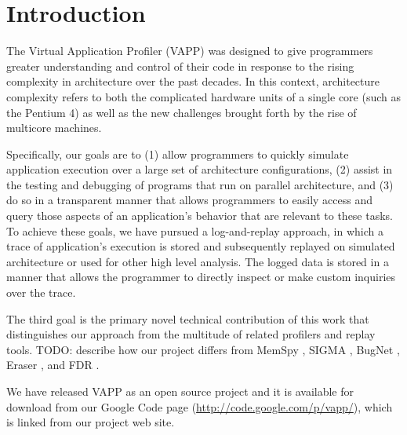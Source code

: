 \section{Introduction}
The Virtual Application Profiler (VAPP) was designed to give programmers
greater understanding and control of their code in response to
the rising complexity in architecture over the past decades.
In this context, architecture complexity refers to both the
complicated hardware units of a single core (such as the Pentium 4)
as well as the new challenges brought forth by the rise of
multicore machines.

Specifically, our goals are to (1) allow programmers to quickly
simulate application execution over a large set of architecture
configurations, (2) assist in the testing and debugging of
programs that run on parallel architecture, and (3) do so in a
transparent manner that allows programmers to easily access and
query those aspects of an application's behavior that are relevant to
these tasks.  To achieve these goals, we have pursued a
log-and-replay approach, in which a trace of application's execution
is stored and subsequently replayed on simulated architecture or
used for other high level analysis.  The logged data is stored
in a manner that allows the programmer to directly inspect or
make custom inquiries over the trace.

The third goal is the primary novel technical contribution of this
work that distinguishes our approach from the multitude of
related profilers and replay tools.  TODO: describe how our
project differs from MemSpy \cite{martonosi1992memspy},
SIGMA \cite{derose2002sigma}, BugNet \cite{narayansamy2005bugnet},
Eraser \cite{savage1997eraser}, and FDR \cite{xu2003fdr}.

We have released VAPP as an open source project and it is available
for download from our Google Code page (\url{http://code.google.com/p/vapp/}),
which is linked from our project web site.